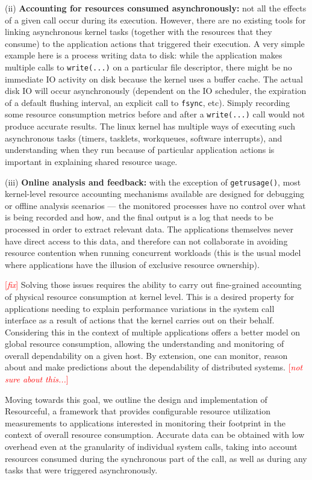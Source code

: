 \documentclass[letterpaper,twocolumn,10pt]{article}
\newcommand{\pname}{Resourceful}
\newcommand{\lnote}[1]{\textcolor{red}{[\textit{#1}]}} %
\begin{document}
(ii) \textbf{Accounting for resources consumed asynchronously:} not all the
effects of a given call occur during its execution. However, there are no
existing tools for linking asynchronous kernel tasks (together with the
resources that they consume) to the application actions that triggered their
execution. A very simple example here is a process writing data to disk: while
the application makes multiple calls to \texttt{write(...)} on a particular file
descriptor, there might be no immediate IO activity on disk because the kernel
uses a buffer cache. The actual disk IO will occur asynchronously (dependent on
the IO scheduler, the expiration of a default flushing interval, an explicit
call to \texttt{fsync}, etc). Simply recording some resource consumption metrics
before and after a \texttt{write(...)} call would not produce accurate results.
The linux kernel has multiple ways of executing such asynchronous tasks (timers,
tasklets, workqueues, software interrupts), and understanding when they run
because of particular application actions is important in explaining shared
resource usage.

(iii) \textbf{Online analysis and feedback:} with the exception of
\texttt{getrusage()}, most kernel-level resource accounting mechanisms available
are designed for debugging or offline analysis scenarios --- the monitored
processes have no control over what is being recorded and how, and the final
output is a log that needs to be processed in order to extract relevant data.
The applications themselves never have direct access to this data, and therefore
can not collaborate in avoiding resource contention when running concurrent
workloads (this is the usual model where applications have the illusion of
exclusive resource ownership).

\lnote{fix} Solving those issues requires the ability to carry out fine-grained
accounting of physical resource consumption at kernel level. This is a desired
property for applications needing to explain performance variations in the
system call interface as a result of actions that the kernel carries out on
their behalf. Considering this in the context of multiple applications offers a
better model on global resource consumption, allowing the understanding and
monitoring of overall dependability on a given host. By extension, one can
monitor, reason about and make predictions about the dependability of
distributed systems. \lnote{not sure about this...}

Moving towards this goal, we outline the design and implementation of \pname, a
framework that provides configurable resource utilization measurements to
applications interested in monitoring their footprint in the context of overall
resource consumption. Accurate data can be obtained with low overhead even at
the granularity of individual system calls, taking into account resources
consumed during the synchronous part of the call, as well as during any tasks
that were triggered asynchronously.
\end{document}
